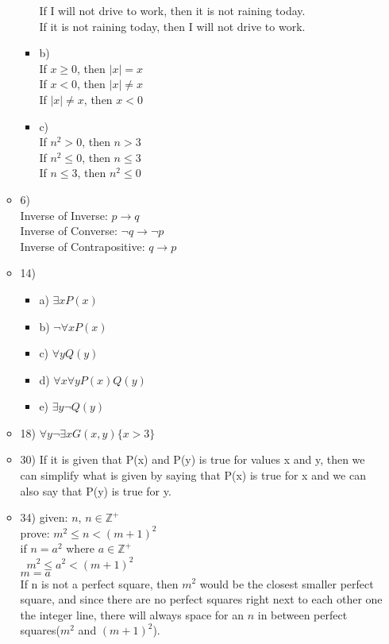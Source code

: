\documentclass{article}
\begin{document}
\begin{itemize}
\begin{itemize}
\begin{itemize}
      If I will not drive to work, then it is not raining today.\\
      If it is not raining today, then I will not drive to work.
      \item
      b)\\
      If $x\ge 0$, then $|x|=x$\\
      If $x< 0$, then $|x|\ne x$\\
      If $|x|\ne x$, then $x<0$
      \item
      c)\\
      If $n^{2}>0$, then $n>3$\\
      If $n^{2}\le 0$, then $n\le 3$\\
      If $n\le 3$, then $n^{2}\le 0$
    \end{itemize}
  \item
  6)\\
  Inverse of Inverse: \hfill $p\to q$\\
  Inverse of Converse: \hfill $\lnot q \to \lnot p$\\
  Inverse of Contrapositive: \hfill $q \to p$
  \item
  14)
  \begin{itemize}
    \item
    a) $\exists xP(x)$
    \item
    b) $\lnot \forall x P(x)$
    \item
    c) $\forall yQ(y)$
    \item
    d) $\forall x\forall y P(x)Q(y)$
    \item
    e) $\exists y\lnot Q(y)$
  \end{itemize}
  \item
  18) $\forall y \lnot \exists xG(x,y)\{x>3\}$
  \item
  30) If it is given that P(x) and P(y) is true for values x and y, then we can simplify what is given by saying that P(x) is true for x and we can also say that P(y) is true for y.
  \item
  34) given: $n$, $n\in \mathbb{Z}^{+}$\\
  prove: $m^{2}\le n<(m+1)^{2}$\\
  if $n=a^{2}$ where $a\in \mathbb{Z}^{+}$\\
  $\;\; m^{2}\le a^{2}<(m+1)^{2}$\\
  $m=a$\\
  If n is not a perfect square, then $m^{2}$ would be the closest smaller perfect square, and since there are no perfect squares right next to each other one the integer line, there will always space for an $n$ in between perfect squares($m^{2}$ and $(m+1)^2$). 
  \end{itemize}
\end{itemize}
\end{document}
